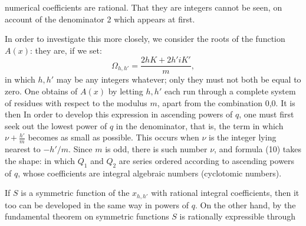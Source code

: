 numerical coefficients are rational. That they are integers cannot be
seen, on account of the denominator 2 which appears at first.

In order to investigate this more closely, we consider the roots
of the function $A(x)$: they are, if we set:
\[
\Omega_{h,h'} = \frac{2hK+2h'iK'}{m},
\]
in which $h,h'$ may be any integers whatever; only they must not
both be equal to zero. One obtains  of
$A(x)$ by letting $h,h'$ each run through a complete system of
residues with respect to the modulus $m$, apart from the combination 0,0.
It is then
In order to develop this expression in ascending powers of $q$,
one must first seek out the lowest power of $q$ in the denominator,
that is, the term in which $\nu+\frac{h'}{m}$ becomes as small as
possible. This occurs when $\nu$ is the integer lying nearest to $-h'/m$.
Since $m$ is odd, there is  such
number $\nu$, and formula (10) takes the shape:
in which $Q_1$ and $Q_2$ are series ordered according to ascending powers of $q$,
whose coefficients are integral algebraic numbers (cyclotomic
numbers).


If $S$ is a symmetric function of the $x_{h,h'}$ with rational
integral coefficients, then it too can be developed in the same
way in powers of $q$. On the other hand, by
the fundamental theorem on symmetric functions $S$ is rationally expressible through
